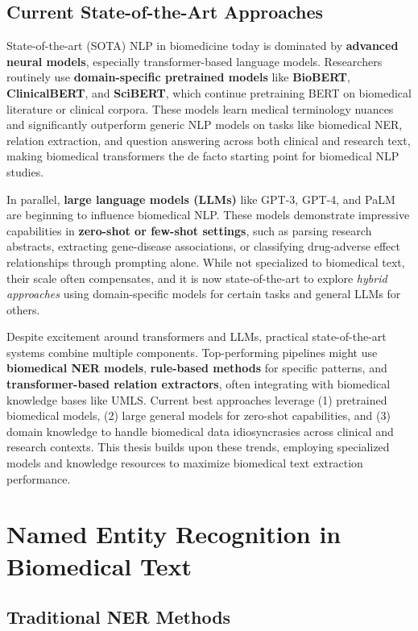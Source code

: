 \subsection{Current State-of-the-Art Approaches}

State-of-the-art (SOTA) NLP in biomedicine today is dominated by \textbf{advanced neural models}, especially transformer-based language models. Researchers routinely use \textbf{domain-specific pretrained models} like \textbf{BioBERT}, \textbf{ClinicalBERT}, and \textbf{SciBERT}, which continue pretraining BERT on biomedical literature or clinical corpora. These models learn medical terminology nuances and significantly outperform generic NLP models on tasks like biomedical NER, relation extraction, and question answering across both clinical and research text, making biomedical transformers the de facto starting point for biomedical NLP studies.

In parallel, \textbf{large language models (LLMs)} like GPT-3, GPT-4, and PaLM are beginning to influence biomedical NLP. These models demonstrate impressive capabilities in \textbf{zero-shot or few-shot settings}, such as parsing research abstracts, extracting gene-disease associations, or classifying drug-adverse effect relationships through prompting alone. While not specialized to biomedical text, their scale often compensates, and it is now state-of-the-art to explore \emph{hybrid approaches} using domain-specific models for certain tasks and general LLMs for others.

Despite excitement around transformers and LLMs, practical state-of-the-art systems combine multiple components. Top-performing pipelines might use \textbf{biomedical NER models}, \textbf{rule-based methods} for specific patterns, and \textbf{transformer-based relation extractors}, often integrating with biomedical knowledge bases like UMLS. Current best approaches leverage (1) pretrained biomedical models, (2) large general models for zero-shot capabilities, and (3) domain knowledge to handle biomedical data idiosyncrasies across clinical and research contexts. This thesis builds upon these trends, employing specialized models and knowledge resources to maximize biomedical text extraction performance.

\section{Named Entity Recognition in Biomedical Text}

\subsection{Traditional NER Methods}

